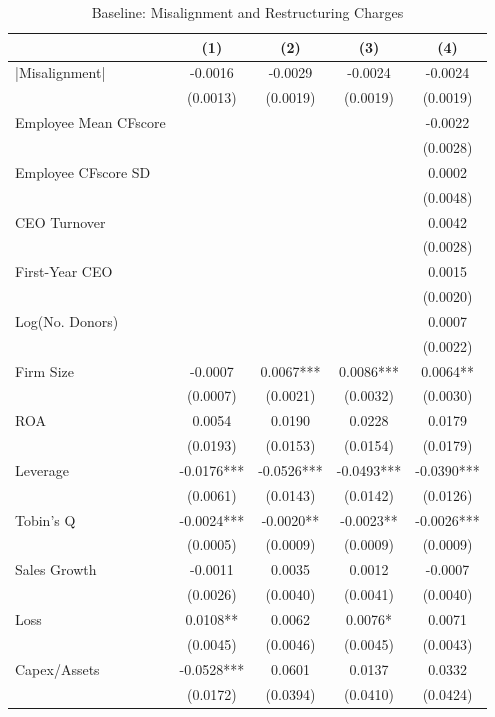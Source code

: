 \documentclass[
  10pt,
]{article}
\begin{document}
\begin{table}[!h]
\centering
\caption{\label{tab:table3}Baseline: Misalignment and Restructuring Charges}
\centering
\fontsize{8}{10}\selectfont
\begin{threeparttable}
\begin{tabular}[t]{lcccc}
\toprule
 & (1) & (2) & (3) & (4)\\
\midrule
|Misalignment| & -0.0016 & -0.0029 & -0.0024 & -0.0024\\
 & (0.0013) & (0.0019) & (0.0019) & (0.0019)\\
Employee Mean CFscore &  &  &  & -0.0022\\
 &  &  &  & \vphantom{1} (0.0028)\\
Employee CFscore SD &  &  &  & 0.0002\\
\addlinespace
 &  &  &  & (0.0048)\\
CEO Turnover &  &  &  & 0.0042\\
 &  &  &  & (0.0028)\\
First-Year CEO &  &  &  & 0.0015\\
 &  &  &  & (0.0020)\\
\addlinespace
Log(No. Donors) &  &  &  & 0.0007\\
 &  &  &  & (0.0022)\\
Firm Size & -0.0007 & 0.0067*** & 0.0086*** & 0.0064**\\
 & (0.0007) & (0.0021) & (0.0032) & (0.0030)\\
ROA & 0.0054 & 0.0190 & 0.0228 & 0.0179\\
\addlinespace
 & (0.0193) & (0.0153) & (0.0154) & (0.0179)\\
Leverage & -0.0176*** & -0.0526*** & -0.0493*** & -0.0390***\\
 & (0.0061) & (0.0143) & (0.0142) & (0.0126)\\
Tobin's Q & -0.0024*** & -0.0020** & -0.0023** & -0.0026***\\
 & (0.0005) & (0.0009) & (0.0009) & (0.0009)\\
\addlinespace
Sales Growth & -0.0011 & 0.0035 & 0.0012 & -0.0007\\
 & (0.0026) & (0.0040) & (0.0041) & (0.0040)\\
Loss & 0.0108** & 0.0062 & 0.0076* & 0.0071\\
 & (0.0045) & (0.0046) & (0.0045) & (0.0043)\\
Capex/Assets & -0.0528*** & 0.0601 & 0.0137 & 0.0332\\
\addlinespace
 & (0.0172) & (0.0394) & (0.0410) & (0.0424)\\

\end{tabular}
\end{threeparttable}
\end{table}
\end{document}
